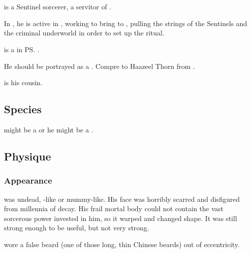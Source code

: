 \section[Locar Psyrex]{\LocarPsyrex}
\index{\LocarPsyrex}
\index{\Psyrex}
\LocarPsyrex{} is a \scathaese{} Sentinel \chaos{} sorcerer, a servitor of \Secherdamon. 

In \emph{\TwilightAngelRemember{}}, he is active in \Malcur, working to bring \Nithd{} to \Miith{}, pulling the strings of the \Malcuric{} Sentinels and the criminal underworld in order to set up the ritual. 

\Psyrex{} is a \vertex{} in \ps{\Secherdamon} \matrix. 

He should be portrayed as a  . Compre to Haazeel Thorn from \FLuneNoire. 


 is his cousin. 









\subsection{Species}
\LocarPsyrex might be a \scatha or he might be a \quiljaar. 









\subsection{Physique}





\subsubsection{Appearance}
\Psyrex was undead, \Lich-like or mummy-like. 
His face was horribly scarred and disfigured from millennia of decay.
His frail mortal body could not contain the vast sorcerous power invested in him, so it warped and changed shape.
It was still strong enough to be useful, but not very strong.

\Psyrex{} wore a false beard (one of those long, thin Chinese beards) out of eccentricity. 








